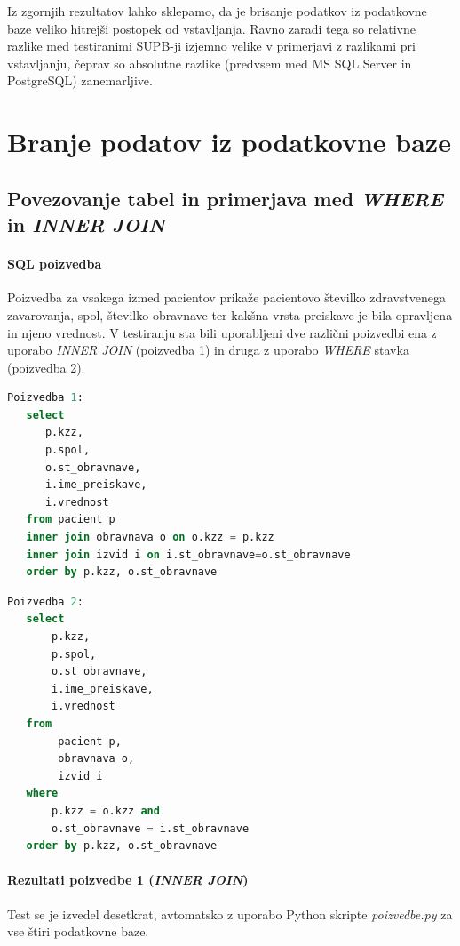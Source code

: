 \documentclass[a4paper,11pt]{report}
\begin{document}
Iz zgornjih rezultatov lahko sklepamo, da je brisanje podatkov iz podatkovne baze veliko hitrejši postopek od vstavljanja.
Ravno zaradi tega so relativne razlike med testiranimi SUPB-ji izjemno velike v primerjavi z razlikami pri vstavljanju, čeprav
so absolutne razlike (predvsem med MS SQL Server in PostgreSQL) zanemarljive.

\section{Branje podatov iz podatkovne baze}
\subsection{Povezovanje tabel in primerjava med \textit{WHERE} in \textit{INNER JOIN}}

\paragraph{SQL poizvedba}
Poizvedba za vsakega izmed pacientov prikaže pacientovo številko zdravstvenega zavarovanja, spol, številko obravnave
ter kakšna vrsta preiskave je bila opravljena in njeno vrednost. V testiranju sta bili uporabljeni dve različni poizvedbi
ena z uporabo \textit{INNER JOIN} (poizvedba 1) in druga z uporabo \textit{WHERE} stavka (poizvedba 2).
\begin{lstlisting}[language = SQL]
Poizvedba 1:
   select
      p.kzz,
      p.spol,
      o.st_obravnave,
      i.ime_preiskave,
      i.vrednost
   from pacient p
   inner join obravnava o on o.kzz = p.kzz
   inner join izvid i on i.st_obravnave=o.st_obravnave
   order by p.kzz, o.st_obravnave
\end{lstlisting}
\pagebreak
\begin{lstlisting}[language = SQL]
Poizvedba 2:
   select
       p.kzz,
       p.spol,
       o.st_obravnave,
       i.ime_preiskave,
       i.vrednost
   from
        pacient p,
        obravnava o,
        izvid i
   where
       p.kzz = o.kzz and
       o.st_obravnave = i.st_obravnave
   order by p.kzz, o.st_obravnave
\end{lstlisting}

\paragraph{Rezultati poizvedbe 1 (\textit{INNER JOIN})}
Test se je izvedel desetkrat, avtomatsko z uporabo Python skripte \textit{poizvedbe.py} za vse štiri podatkovne baze.
\end{document}
